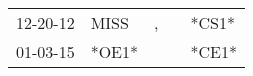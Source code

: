 \begin{supertabular}{lllll}
 12-20-12 &   MISS &  , &   &  *CS1* \\
 01-03-15 &  *OE1* &    &   &  *CE1* \\
\end{supertabular}
